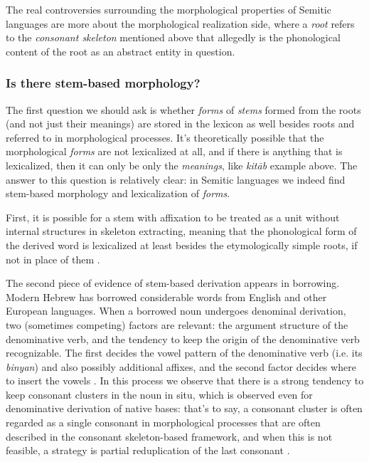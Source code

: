 \documentclass[a4paper, oneside, 12pt]{report}
\newcommand*{\citepage}[1]{p.~{#1}}
\newcommand*{\citepages}[1]{pp.~{#1}}
\newcommand*{\term}[1]{\emph{#1}}
\newcommand{\form}[1]{\emph{#1}}
\begin{document}
The real controversies surrounding the morphological properties of Semitic languages
are more about the morphological realization side,
where a \term{root} refers to the \emph{consonant skeleton} mentioned above
that allegedly is the phonological content of the root as an abstract entity in question.

\subsubsection{Is there stem-based morphology?}

The first question we should ask is whether \emph{forms} of \emph{stems} formed from the roots (and not just their meanings) are stored in the lexicon as well besides roots
and referred to in morphological processes.
It's theoretically possible that the morphological \emph{forms} are not lexicalized at all,
and if there is anything that is lexicalized,
then it can only be only the \emph{meanings},
like \form{kitāb} example above.
The answer to this question is relatively clear:
in Semitic languages we indeed find stem-based morphology and lexicalization of \form{forms}.

First, it is possible for a stem with affixation to be treated as
a unit without internal structures in skeleton extracting,
meaning that the phonological form of the derived word is lexicalized
at least besides the etymologically simple roots, 
if not in place of them \citep[\citepage{132}]{bolozky2008roots}.

The second piece of evidence of stem-based derivation appears in borrowing.
Modern Hebrew has borrowed considerable words from English and other European languages.
When a borrowed noun undergoes denominal derivation,
two (sometimes competing) factors are relevant:
the argument structure of the denominative verb,
and the tendency to keep the origin of the denominative verb recognizable.
The first decides the vowel pattern of the denominative verb 
(i.e. its \form{binyan}) and also possibly additional affixes,
and the second factor decides where to insert the vowels
\citep[\citepages{133-134}]{bolozky2008roots}.
In this process we observe that there is a strong tendency to 
keep consonant clusters in the noun in situ,
which is observed even for denominative derivation of native bases:
that's to say, a consonant cluster is often regarded as a single consonant
in morphological processes that are often described in the consonant skeleton-based framework,
and when this is not feasible,
a strategy is partial reduplication of the last consonant
\citep[\citepages{134-135}]{bolozky2008roots}.
\end{document}
